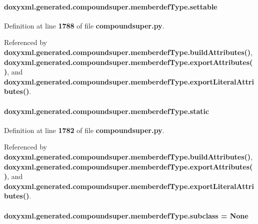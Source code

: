 \paragraph[{settable}]{\setlength{\rightskip}{0pt plus 5cm}doxyxml.\+generated.\+compoundsuper.\+memberdef\+Type.\+settable}\label{classdoxyxml_1_1generated_1_1compoundsuper_1_1memberdefType_abd3de7becca1541e4218ade84ff78da1}


Definition at line {\bf 1788} of file {\bf compoundsuper.\+py}.



Referenced by {\bf doxyxml.\+generated.\+compoundsuper.\+memberdef\+Type.\+build\+Attributes()}, {\bf doxyxml.\+generated.\+compoundsuper.\+memberdef\+Type.\+export\+Attributes()}, and {\bf doxyxml.\+generated.\+compoundsuper.\+memberdef\+Type.\+export\+Literal\+Attributes()}.

\paragraph[{static}]{\setlength{\rightskip}{0pt plus 5cm}doxyxml.\+generated.\+compoundsuper.\+memberdef\+Type.\+static}\label{classdoxyxml_1_1generated_1_1compoundsuper_1_1memberdefType_a84e3c846b91904bc0bcbedcf68c9165c}


Definition at line {\bf 1782} of file {\bf compoundsuper.\+py}.



Referenced by {\bf doxyxml.\+generated.\+compoundsuper.\+memberdef\+Type.\+build\+Attributes()}, {\bf doxyxml.\+generated.\+compoundsuper.\+memberdef\+Type.\+export\+Attributes()}, and {\bf doxyxml.\+generated.\+compoundsuper.\+memberdef\+Type.\+export\+Literal\+Attributes()}.

\paragraph[{subclass}]{\setlength{\rightskip}{0pt plus 5cm}doxyxml.\+generated.\+compoundsuper.\+memberdef\+Type.\+subclass = None\hspace{0.3cm}{\ttfamily [static]}}\label{classdoxyxml_1_1generated_1_1compoundsuper_1_1memberdefType_a6cd02c9300a75464ba83db347dcc03c4}


